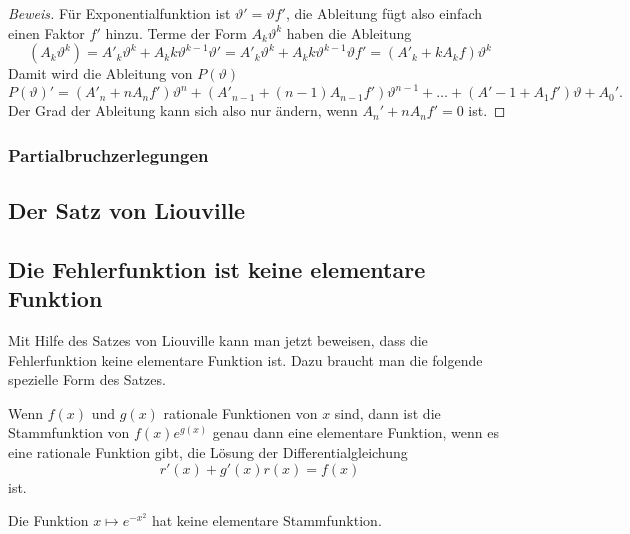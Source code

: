\begin{proof}[Beweis]
Für Exponentialfunktion ist $\vartheta'=\vartheta f'$, die Ableitung
fügt also einfach einen Faktor $f'$ hinzu.
Terme der Form $A_k\vartheta^k$ haben die Ableitung
\[
(A_k\vartheta^k)
=
A'_k\vartheta^k + A_kk\vartheta^{k-1}\vartheta'
=
A'_k\vartheta^k + A_kk\vartheta^{k-1}\vartheta f'
=
(A'_k + kA_k f)\vartheta^k
\]
Damit wird die Ableitung von $P(\vartheta)$
\[
P(\vartheta)'
=
(A'_n+nA_nf')\vartheta^n
+
(A'_{n-1}+(n-1)A_{n-1}f')\vartheta^{n-1}
+ \dots + 
(A'-1+A_1f')\vartheta + A_0'.
\]
Der Grad der Ableitung kann sich also nur ändern, wenn $A_n'+nA_nf'=0$ ist.
\end{proof}

\subsubsection{Partialbruchzerlegungen}

\subsection{Der Satz von Liouville
\label{buch:integrale:section:liouville}}

\subsection{Die Fehlerfunktion ist keine elementare Funktion
\label{buch:integrale:section:fehlernichtelementar}}
Mit Hilfe des Satzes von Liouville kann man jetzt beweisen, dass 
die Fehlerfunktion keine elementare Funktion ist.
Dazu braucht man die folgende spezielle Form des Satzes.

\begin{satz}
\label{buch:integrale:satz:elementarestammfunktion}
Wenn $f(x)$ und $g(x)$ rationale Funktionen von $x$ sind, dann
ist die Stammfunktion von $f(x)e^{g(x)}$ genau dann eine 
elementare Funktion, wenn es eine rationale Funktion gibt, die
Lösung der Differentialgleichung
\[
r'(x) + g'(x)r(x)=f(x)
\]
ist.
\end{satz}

\begin{satz}
Die Funktion $x\mapsto e^{-x^2}$ hat keine elementare Stammfunktion.
\label{buch:iintegrale:satz:expx2}
\end{satz}

